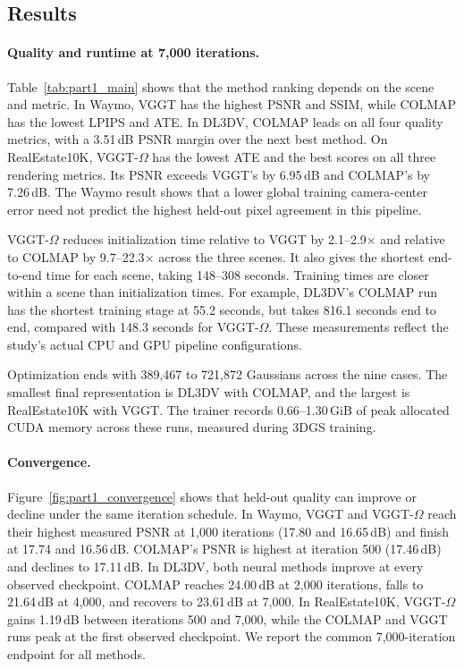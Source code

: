 \subsection{Results}

\paragraph{Quality and runtime at 7,000 iterations.}
Table~\ref{tab:part1_main} shows that the method ranking depends on the scene and metric. In Waymo, VGGT has the highest PSNR and SSIM, while COLMAP has the lowest LPIPS and ATE. In DL3DV, COLMAP leads on all four quality metrics, with a 3.51\,dB PSNR margin over the next best method. On RealEstate10K, VGGT-$\Omega$ has the lowest ATE and the best scores on all three rendering metrics. Its PSNR exceeds VGGT's by 6.95\,dB and COLMAP's by 7.26\,dB. The Waymo result shows that a lower global training camera-center error need not predict the highest held-out pixel agreement in this pipeline.

VGGT-$\Omega$ reduces initialization time relative to VGGT by 2.1--2.9$\times$ and relative to COLMAP by 9.7--22.3$\times$ across the three scenes. It also gives the shortest end-to-end time for each scene, taking 148--308 seconds. Training times are closer within a scene than initialization times. For example, DL3DV's COLMAP run has the shortest training stage at 55.2 seconds, but takes 816.1 seconds end to end, compared with 148.3 seconds for VGGT-$\Omega$. These measurements reflect the study's actual CPU and GPU pipeline configurations.

Optimization ends with 389,467 to 721,872 Gaussians across the nine cases. The smallest final representation is DL3DV with COLMAP, and the largest is RealEstate10K with VGGT. The trainer records 0.66--1.30\,GiB of peak allocated CUDA memory across these runs, measured during 3DGS training.

\paragraph{Convergence.}
Figure~\ref{fig:part1_convergence} shows that held-out quality can improve or decline under the same iteration schedule. In Waymo, VGGT and VGGT-$\Omega$ reach their highest measured PSNR at 1,000 iterations (17.80 and 16.65\,dB) and finish at 17.74 and 16.56\,dB. COLMAP's PSNR is highest at iteration 500 (17.46\,dB) and declines to 17.11\,dB. In DL3DV, both neural methods improve at every observed checkpoint. COLMAP reaches 24.00\,dB at 2,000 iterations, falls to 21.64\,dB at 4,000, and recovers to 23.61\,dB at 7,000. In RealEstate10K, VGGT-$\Omega$ gains 1.19\,dB between iterations 500 and 7,000, while the COLMAP and VGGT runs peak at the first observed checkpoint. We report the common 7,000-iteration endpoint for all methods.

